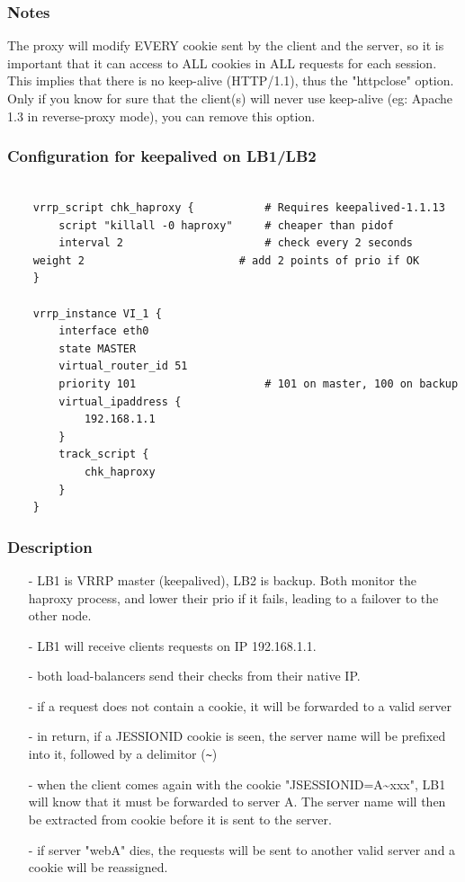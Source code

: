 \subsubsection{Notes}

The proxy will modify EVERY cookie sent by the client and the server,
so it is important that it can access to ALL cookies in ALL requests for
each session. This implies that there is no keep-alive (HTTP/1.1), thus the
"httpclose" option. Only if you know for sure that the client(s) will never
use keep-alive (eg: Apache 1.3 in reverse-proxy mode), you can remove this
option.

\subsubsection{Configuration for keepalived on LB1/LB2}

\begin{verbatim}

    vrrp_script chk_haproxy {           # Requires keepalived-1.1.13
        script "killall -0 haproxy"     # cheaper than pidof
        interval 2                      # check every 2 seconds
	weight 2                        # add 2 points of prio if OK
    }

    vrrp_instance VI_1 {
        interface eth0
        state MASTER
        virtual_router_id 51
        priority 101                    # 101 on master, 100 on backup
        virtual_ipaddress {
            192.168.1.1
        }
        track_script {
            chk_haproxy
        }
    }
\end{verbatim}

\subsubsection{Description}

\begin{itemize}
\item[-] LB1 is VRRP master (keepalived), LB2 is backup. Both monitor the haproxy
   process, and lower their prio if it fails, leading to a failover to the
   other node.
\item[-] LB1 will receive clients requests on IP 192.168.1.1.
\item[-] both load-balancers send their checks from their native IP.
\item[-] if a request does not contain a cookie, it will be forwarded to a valid
   server
\item[-] in return, if a JESSIONID cookie is seen, the server name will be prefixed
   into it, followed by a delimitor (\verb|~|)
\item[-] when the client comes again with the cookie "JSESSIONID=A\~{}xxx", LB1 will
   know that it must be forwarded to server A. The server name will then be
   extracted from cookie before it is sent to the server.
\item[-] if server "webA" dies, the requests will be sent to another valid server
   and a cookie will be reassigned.
\end{itemize}

